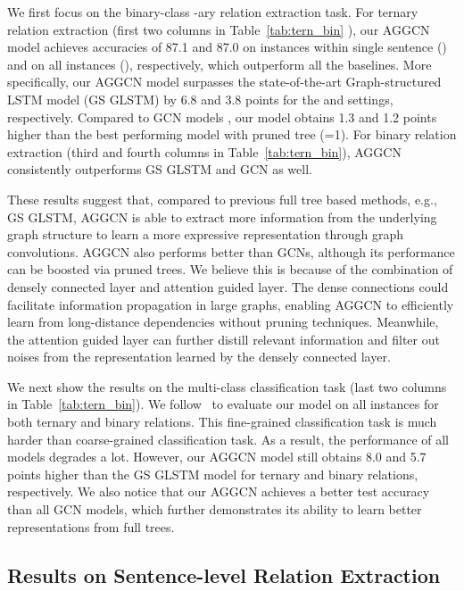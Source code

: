 \documentclass[11pt,a4paper]{article}
\begin{document}
We first focus on the binary-class -ary relation extraction task.  For ternary relation extraction (first two columns in Table~\ref{tab:tern_bin} ), our AGGCN model achieves accuracies of 87.1 and 87.0  on instances within single sentence  () and on all instances (), respectively,  which outperform all the baselines. More specifically, our AGGCN model surpasses the state-of-the-art     Graph-structured LSTM model (GS GLSTM) by 6.8 and 3.8 points for the  and  settings, respectively. Compared to GCN models , our model   obtains 1.3 and 1.2 points higher than the best performing model with pruned tree (=1). For binary relation extraction (third and fourth columns in Table~\ref{tab:tern_bin}), AGGCN consistently outperforms GS GLSTM and GCN as well. 

These results suggest that, compared to previous full tree based methods, e.g., GS GLSTM,  AGGCN is able to extract more information from the underlying graph structure to learn a more expressive representation through graph convolutions. AGGCN also performs better than GCNs, although its performance can be boosted via pruned trees. We believe this is because of the combination of densely connected layer and attention guided layer. The dense connections could facilitate information propagation in large graphs, enabling AGGCN to efficiently learn from long-distance dependencies without pruning techniques. Meanwhile, the attention guided layer can further distill relevant information and filter out noises from the representation learned by the densely connected layer. 

We next show the results on the multi-class classification task (last two columns in Table~\ref{tab:tern_bin}). We follow~\citep{Song2018NaryRE} to evaluate our model on all instances for both ternary and binary relations. This fine-grained classification task is much harder than coarse-grained classification task. As a result,  the performance of all models degrades a lot. However, our AGGCN model still obtains 8.0 and 5.7  points  higher than the GS GLSTM model for ternary and binary relations, respectively. We also notice that our AGGCN achieves a better test accuracy than all GCN models, which further demonstrates its ability to learn better representations from full trees. 

\subsection{Results on Sentence-level Relation Extraction}
\end{document}

